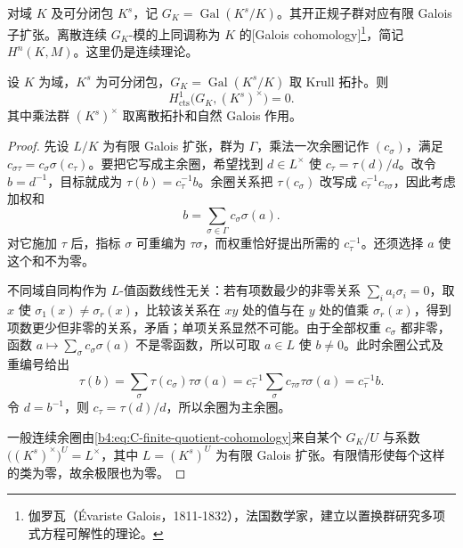 对域 \(K\) 及可分闭包 \(K^s\)，记 \(G_K=\operatorname{Gal}(K^s/K)\)。其开正规子群对应有限 Galois 子扩张。离散连续 \(G_K\)-模的上同调称为 \(K\) 的[Galois cohomology]\footnote{伽罗瓦（Évariste Galois，1811-1832），法国数学家，建立以置换群研究多项式方程可解性的理论。}，简记 \(H^n(K,M)\)。这里仍是连续理论。

\begin{theorem}[Hilbert 第 90 定理]\label{b4:thm:C-hilbert90}
	设 \(K\) 为域，\(K^s\) 为可分闭包，\(G_K=\operatorname{Gal}(K^s/K)\) 取 Krull 拓扑。则
	\[
		H^1_{\mathrm{cts}}\bigl(G_K,(K^s)^\times\bigr)=0.
	\]
	其中乘法群 \((K^s)^\times\) 取离散拓扑和自然 Galois 作用。
\end{theorem}
\begin{proof}
	先设 \(L/K\) 为有限 Galois 扩张，群为 \(\Gamma\)，乘法一次余圈记作 \((c_\sigma)\)，满足 \(c_{\sigma\tau}=c_\sigma\sigma(c_\tau)\)。要把它写成主余圈，希望找到 \(d\in L^\times\) 使 \(c_\tau=\tau(d)/d\)。改令 \(b=d^{-1}\)，目标就成为 \(\tau(b)=c_\tau^{-1}b\)。余圈关系把 \(\tau(c_\sigma)\) 改写成 \(c_\tau^{-1}c_{\tau\sigma}\)，因此考虑加权和
	\[
		b=\sum_{\sigma\in\Gamma}c_\sigma\sigma(a).
	\]
	对它施加 \(\tau\) 后，指标 \(\sigma\) 可重编为 \(\tau\sigma\)，而权重恰好提出所需的 \(c_\tau^{-1}\)。还须选择 \(a\) 使这个和不为零。

	不同域自同构作为 \(L\)-值函数线性无关：若有项数最少的非零关系 \(\sum_i a_i\sigma_i=0\)，取 \(x\) 使 \(\sigma_1(x)\ne\sigma_r(x)\)，比较该关系在 \(xy\) 处的值与在 \(y\) 处的值乘 \(\sigma_r(x)\)，得到项数更少但非零的关系，矛盾；单项关系显然不可能。由于全部权重 \(c_\sigma\) 都非零，函数 \(a\mapsto\sum_\sigma c_\sigma\sigma(a)\) 不是零函数，所以可取 \(a\in L\) 使 \(b\ne0\)。此时余圈公式及重编号给出
	\[
		\tau(b)=\sum_{\sigma}\tau(c_\sigma)\tau\sigma(a) =c_\tau^{-1}\sum_\sigma c_{\tau\sigma}\tau\sigma(a) =c_\tau^{-1}b.
	\]
	令 \(d=b^{-1}\)，则 \(c_\tau=\tau(d)/d\)，所以余圈为主余圈。

	一般连续余圈由\eqref{b4:eq:C-finite-quotient-cohomology}来自某个 \(G_K/U\) 与系数 \(\bigl((K^s)^\times\bigr)^U=L^\times\)，其中 \(L=(K^s)^U\) 为有限 Galois 扩张。有限情形使每个这样的类为零，故余极限也为零。
\end{proof}

